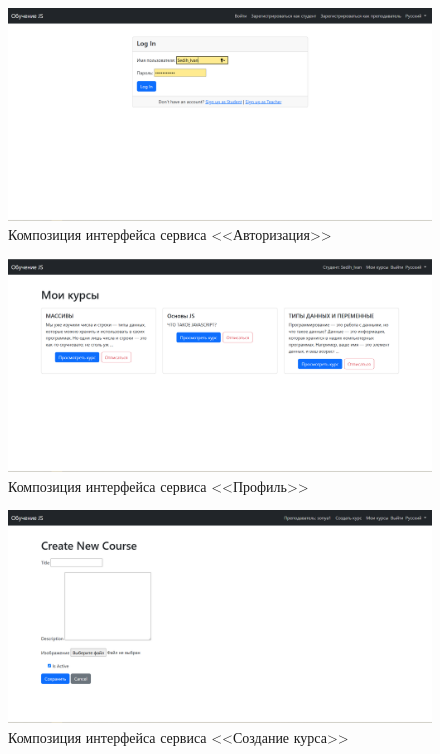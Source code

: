 \begin{figure}[ht]
	\centering
	\includegraphics[width=1\linewidth]{images/Авторизация}
	\caption{Композиция интерфейса сервиса <<Авторизация>>}
	\label{templ:image7}
\end{figure}


\begin{figure}[ht]
	\centering
	\includegraphics[width=1\linewidth]{images/профиль}
	\caption{Композиция интерфейса сервиса <<Профиль>>}
	\label{templ:image8}
\end{figure}


\begin{figure}[ht]
	\centering
	\includegraphics[width=1\linewidth]{images/создатькурс}
	\caption{Композиция интерфейса сервиса <<Создание курса>>}
	\label{templ:image9}
\end{figure}


